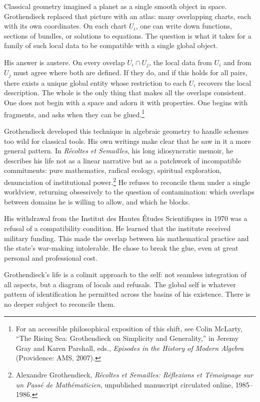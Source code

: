 \documentclass[12pt,a4paper]{article}
\begin{document}
Classical geometry imagined a planet as a single smooth object in space. Grothendieck replaced that picture with an atlas: many overlapping charts, each with its own coordinates. On each chart $U_i$, one can write down functions, sections of bundles, or solutions to equations. The question is what it takes for a family of such local data to be compatible with a single global object.

His answer is austere. On every overlap $U_i \cap U_j$, the local data from $U_i$ and from $U_j$ must agree where both are defined. If they do, and if this holds for all pairs, there exists a unique global entity whose restriction to each $U_i$ recovers the local description. The whole is the only thing that makes all the overlaps consistent. One does not begin with a space and adorn it with properties. One begins with fragments, and asks when they can be glued.\footnote{For an accessible philosophical exposition of this shift, see Colin McLarty, ``The Rising Sea: Grothendieck on Simplicity and Generality,'' in Jeremy Gray and Karen Parshall, eds., \emph{Episodes in the History of Modern Algebra} (Providence: AMS, 2007).}

Grothendieck developed this technique in algebraic geometry to handle schemes too wild for classical tools. His own writings make clear that he saw in it a more general pattern. In \emph{R\'ecoltes et Semailles}, his long idiosyncratic memoir, he describes his life not as a linear narrative but as a patchwork of incompatible commitments: pure mathematics, radical ecology, spiritual exploration, denunciation of institutional power.\footnote{Alexandre Grothendieck, \emph{R\'ecoltes et Semailles: R\'eflexions et T\'emoignage sur un Pass\'e de Math\'ematicien}, unpublished manuscript circulated online, 1985--1986.} He refuses to reconcile them under a single worldview, returning obsessively to the question of contamination: which overlaps between domains he is willing to allow, and which he blocks.

His withdrawal from the Institut des Hautes \'Etudes Scientifiques in 1970 was a refusal of a compatibility condition. He learned that the institute received military funding. This made the overlap between his mathematical practice and the state's war-making intolerable. He chose to break the glue, even at great personal and professional cost.

Grothendieck's life is a colimit approach to the self: not seamless integration of all aspects, but a diagram of locals and refusals. The global self is whatever pattern of identification he permitted across the basins of his existence. There is no deeper subject to reconcile them.
\end{document}
